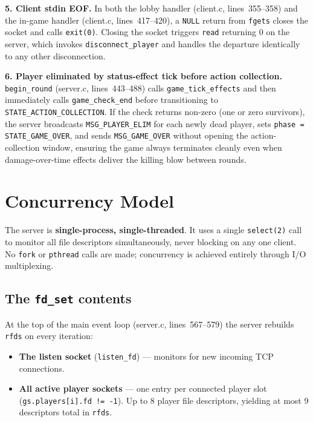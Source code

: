 \documentclass[11pt,letterpaper]{article}
\begin{document}
\textbf{5. Client stdin EOF.} In both the lobby handler (client.c, lines~355--358) and the in-game handler (client.c, lines~417--420), a \texttt{NULL} return from \texttt{fgets} closes the socket and calls \texttt{exit(0)}. Closing the socket triggers \texttt{read} returning 0 on the server, which invokes \texttt{disconnect\_player} and handles the departure identically to any other disconnection.

\textbf{6. Player eliminated by status-effect tick before action collection.} \texttt{begin\_round} (server.c, lines~443--488) calls \texttt{game\_tick\_effects} and then immediately calls \texttt{game\_check\_end} before transitioning to \texttt{STATE\_ACTION\_COLLECTION}. If the check returns non-zero (one or zero survivors), the server broadcasts \texttt{MSG\_PLAYER\_ELIM} for each newly dead player, sets \texttt{phase = STATE\_GAME\_OVER}, and sends \texttt{MSG\_GAME\_OVER} without opening the action-collection window, ensuring the game always terminates cleanly even when damage-over-time effects deliver the killing blow between rounds.

\section{Concurrency Model}

The server is \textbf{single-process, single-threaded}. It uses a single \texttt{select(2)} call to monitor all file descriptors simultaneously, never blocking on any one client. No \texttt{fork} or \texttt{pthread} calls are made; concurrency is achieved entirely through I/O multiplexing.

\subsection*{The \texttt{fd\_set} contents}

At the top of the main event loop (server.c, lines~567--579) the server rebuilds \texttt{rfds} on every iteration:

\begin{itemize}[leftmargin=2em]
    \item \textbf{The listen socket} (\texttt{listen\_fd}) --- monitors for new incoming TCP connections.
    \item \textbf{All active player sockets} --- one entry per connected player slot (\texttt{gs.players[i].fd != -1}). Up to 8 player file descriptors, yielding at most 9 descriptors total in \texttt{rfds}.
\end{itemize}
\end{document}
